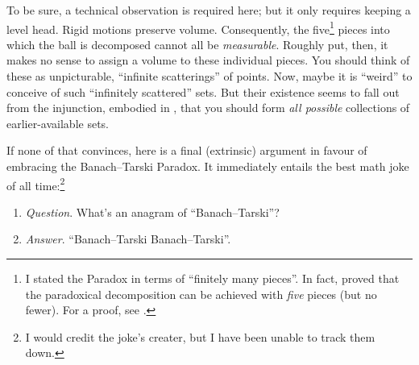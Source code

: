 \documentclass[../../../include/open-logic-section]{subfiles}
\begin{document}
To be sure, a technical observation is required here; but it only requires keeping a level head. Rigid motions preserve volume. Consequently, the five\footnote{I stated the Paradox in terms of ``finitely many pieces''. In fact, \citet{Robinson1947} proved that the paradoxical decomposition can be achieved with \emph{five} pieces (but no fewer). For a proof, see \citet[66--7]{Wagon2016}.} pieces into which the ball is decomposed cannot all be \emph{measurable}. Roughly put, then, it makes no sense to assign a volume to these individual pieces. You should think of these as unpicturable, ``infinite scatterings'' of points. Now, maybe it is ``weird'' to conceive of such ``infinitely scattered'' sets. But their existence seems to fall out from the injunction, embodied in \stagesacc{}, that you should form \emph{all possible} collections of earlier-available sets. 

If none of that convinces, here is a final (extrinsic) argument in favour of embracing the Banach--Tarski Paradox. It immediately entails the best math joke of all time:\footnote{I would credit the joke's creater, but I have been unable to track them down.}
\begin{enumerate}
	\item[] \emph{Question}. What's an anagram of ``Banach--Tarski''? 
	\item[] \emph{Answer}. ``Banach--Tarski Banach--Tarski''.
\end{enumerate}
\end{document}
